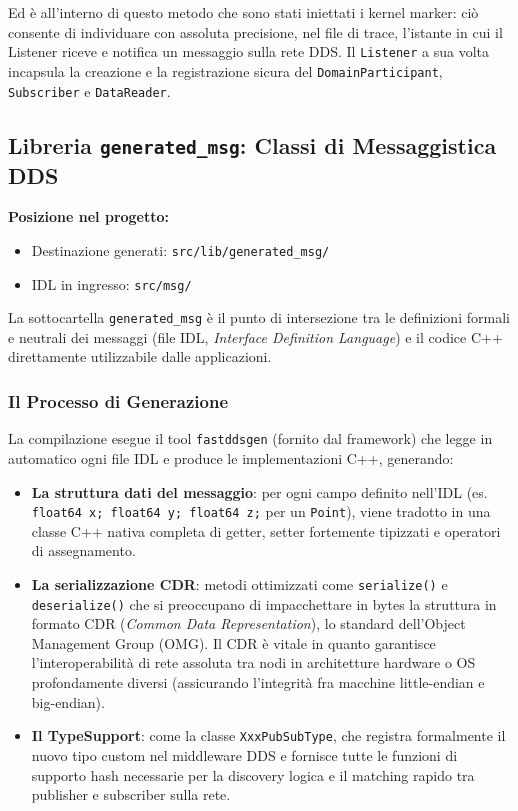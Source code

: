 Ed è all'interno di questo metodo che sono stati iniettati i kernel marker: ciò consente di individuare con assoluta precisione, nel file di trace, l'istante in cui il Listener riceve e notifica un messaggio sulla rete DDS. Il \texttt{Listener} a sua volta incapsula la creazione e la registrazione sicura del \texttt{DomainParticipant}, \texttt{Subscriber} e \texttt{DataReader}.



\subsection{Libreria \texttt{generated\_msg}: Classi di Messaggistica DDS}
\label{sec:lib_generated_msg}

\noindent\textbf{Posizione nel progetto:}
\begin{itemize}
	\item Destinazione generati: \texttt{src/lib/generated\_msg/}
	\item IDL in ingresso: \texttt{src/msg/}
\end{itemize}

La sottocartella \texttt{generated\_msg} è il punto di intersezione tra le definizioni formali e neutrali dei messaggi (file IDL, \textit{Interface Definition Language}) e il codice C++ direttamente utilizzabile dalle applicazioni.

\subsubsection{Il Processo di Generazione}

La compilazione esegue il tool \texttt{fastddsgen} (fornito dal framework) che legge in automatico ogni file IDL e produce le implementazioni C++, generando:
\begin{itemize}
	\item \textbf{La struttura dati del messaggio}: per ogni campo definito nell'IDL (es. \texttt{float64 x; float64 y; float64 z;} per un \texttt{Point}), viene tradotto in una classe C++ nativa completa di getter, setter fortemente tipizzati e operatori di assegnamento.
	\item \textbf{La serializzazione CDR}: metodi ottimizzati come \texttt{serialize()} e \texttt{deserialize()} che si preoccupano di impacchettare in bytes la struttura in formato CDR (\textit{Common Data Representation}), lo standard dell'Object Management Group (OMG). Il CDR è vitale in quanto garantisce l'interoperabilità di rete assoluta tra nodi in architetture hardware o OS profondamente diversi (assicurando l'integrità fra macchine little-endian e big-endian).
	\item \textbf{Il TypeSupport}: come la classe \texttt{XxxPubSubType}, che registra formalmente il nuovo tipo custom nel middleware DDS e fornisce tutte le funzioni di supporto hash necessarie per la discovery logica e il matching rapido tra publisher e subscriber sulla rete.
\end{itemize}

